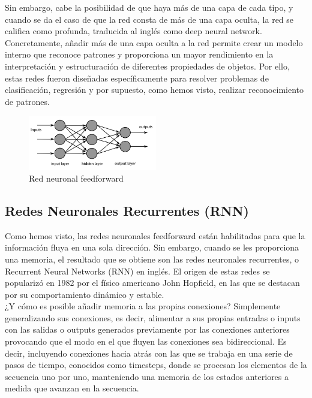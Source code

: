 Sin embargo, cabe la posibilidad de que haya más de una capa de cada tipo, y cuando se da el caso de que la red consta de más de una capa oculta, la red se califica como profunda, traducida al inglés como deep neural network. Concretamente, añadir más de una capa oculta a la red permite crear un modelo interno que reconoce patrones y proporciona un mayor rendimiento en la interpretación y estructuración de diferentes propiedades de objetos. Por ello, estas redes fueron diseñadas específicamente para resolver problemas de clasificación, regresión y por supuesto, como hemos visto, realizar reconocimiento de patrones.\\

\begin{figure}[h]
	\centering
	\includegraphics[width = 0.5\textwidth]{Imagenes/Vectorial/feedforward.png}
	\caption{Red neuronal feedforward}
	\label{fig:feedforward}
\end{figure}



\subsection{Redes Neuronales Recurrentes (RNN)} 

Como hemos visto, las redes neuronales feedforward están habilitadas para que la información fluya en una sola dirección. Sin embargo, cuando se les proporciona una memoria, el resultado que se obtiene son las redes neuronales recurrentes, o Recurrent Neural Networks (RNN) en inglés. El origen de estas redes se popularizó en 1982 por el físico americano John Hopfield, en las que se destacan por su comportamiento dinámico y estable. \\

¿Y cómo es posible añadir memoria a las propias conexiones? Simplemente generalizando sus conexiones, es decir, alimentar a sus propias entradas o inputs con las salidas o outputs generados previamente por las conexiones anteriores provocando que el modo en el que fluyen las conexiones sea bidireccional. Es decir, incluyendo conexiones hacia atrás con las que se trabaja en una serie de pasos de tiempo, conocidos como timesteps, donde se procesan los elementos de la secuencia uno por uno, manteniendo una memoria de los estados anteriores a medida que avanzan en la secuencia.\\

